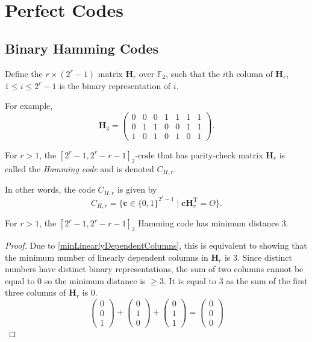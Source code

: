 \section{Perfect Codes}

\subsection{Binary Hamming Codes}

\begin{definition}
    Define the $r\times (2^r-1)$ matrix $\textbf{H}_r$ over $\mathbb{F}_2$, such that the $i$th column of $\textbf{H}_r$, $1\leq i\leq 2^r-1$ is the binary representation of $i$.
\end{definition}

For example,
$$
\textbf{H}_3=
\begin{pmatrix}
    0 & 0 & 0 & 1 & 1 & 1 & 1 \\
    0 & 1 & 1 & 0 & 0 & 1 & 1 \\
    1 & 0 & 1 & 0 & 1 & 0 & 1
\end{pmatrix}.
$$

\begin{definition}
    For $r>1$, the $[2^r-1, 2^r-r-1]_2$-code that has parity-check matrix $\textbf{H}_r$ is called the \textit{Hamming code} and is denoted $C_{H,r}$.
\end{definition}

In other words, the code $C_{H,r}$ is given by
$$C_{H,r}=\{\textbf{c}\in\{0,1\}^{2^r-1}\mid \textbf{c}\textbf{H}_r^\text{T}=O\}.$$

\begin{theorem}
    For $r>1$, the $[2^r-1,2^r-r-1]_2$ Hamming code has minimum distance $3$.
\end{theorem}
\begin{proof}
    Due to \ref{minLinearlyDependentColumns}, this is equivalent to showing that the minimum number of linearly dependent columns in $\textbf{H}_r$ is $3$. Since distinct numbers have distinct binary representations, the sum of two columns cannot be equal to $0$ so the minimum distance is $\geq 3$. It is equal to $3$ as the sum of the first three columns of $\textbf{H}_r$ is $0$.
    $$
    \begin{pmatrix}
        0 \\ 0 \\ 1    
    \end{pmatrix}
    +
    \begin{pmatrix}
        0 \\ 1 \\ 0    
    \end{pmatrix}
    +
    \begin{pmatrix}
        0 \\ 1 \\ 1    
    \end{pmatrix}
    =
    \begin{pmatrix}
        0 \\ 0 \\ 0
    \end{pmatrix}
    $$
\end{proof}

